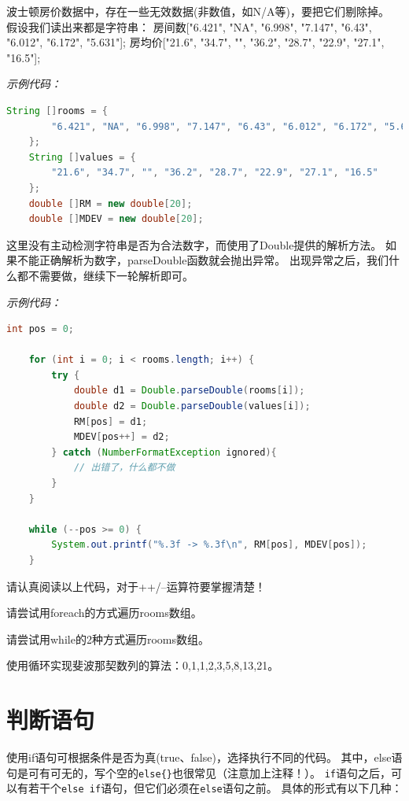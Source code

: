 \begin{example}
	波士顿房价数据中，存在一些无效数据(非数值，如N/A等)，要把它们剔除掉。
	假设我们读出来都是字符串：
	房间数["6.421", "NA", "6.998", "7.147", "6.43", "6.012", "6.172", "5.631"];
	房均价["21.6", "34.7", "", "36.2", "28.7", "22.9", "27.1", "16.5"];
\end{example}

\noindent \emph{示例代码：}
\begin{lstlisting}[language=Java]
	String []rooms = {
		"6.421", "NA", "6.998", "7.147", "6.43", "6.012", "6.172", "5.631"
	};
	String []values = {
		"21.6", "34.7", "", "36.2", "28.7", "22.9", "27.1", "16.5"
	};
	double []RM = new double[20];
	double []MDEV = new double[20];
\end{lstlisting}

\noindent
这里没有主动检测字符串是否为合法数字，而使用了Double提供的解析方法。
如果不能正确解析为数字，parseDouble函数就会抛出异常。
出现异常之后，我们什么都不需要做，继续下一轮解析即可。
\bigskip

\noindent \emph{示例代码：}
\begin{lstlisting}[language=Java]
	int pos = 0;

	for (int i = 0; i < rooms.length; i++) {
		try {
			double d1 = Double.parseDouble(rooms[i]);
			double d2 = Double.parseDouble(values[i]);
			RM[pos] = d1;
			MDEV[pos++] = d2;
		} catch (NumberFormatException ignored){
			// 出错了，什么都不做
		}
	}

	while (--pos >= 0) {
		System.out.printf("%.3f -> %.3f\n", RM[pos], MDEV[pos]);
	}
\end{lstlisting}

\noindent
请认真阅读以上代码，对于++/--运算符要掌握清楚！
\bigskip

\begin{exercise}
	请尝试用foreach的方式遍历rooms数组。
\end{exercise}

\begin{exercise}
	请尝试用while的2种方式遍历rooms数组。
\end{exercise}

\begin{exercise}
	使用循环实现斐波那契数列的算法：0,1,1,2,3,5,8,13,21。
\end{exercise}

\section{判断语句}
使用if语句可根据条件是否为真(true、false)，选择执行不同的代码。
其中，else语句是可有可无的，写个空的\lstinline!else{}!也很常见（注意加上注释！）。
\lstinline{if}语句之后，可以有若干个\lstinline{else if}语句，但它们必须在\lstinline{else}语句之前。
具体的形式有以下几种：

